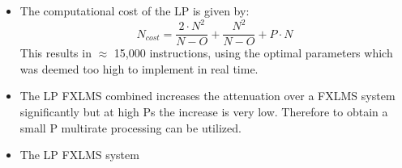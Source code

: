 \large
\begin{itemize}
\item The computational cost of the LP is given by:
	  \begin{equation}
	  N_{cost}=\frac{2\cdot N^2}{N-O}+\frac{N^2}{N-O}+P\cdot N
	  \end{equation}
	  This results in $\approx$ 15,000 instructions, using the optimal parameters which was deemed too high to implement in real time. \\
\item The LP FXLMS combined increases the attenuation over a FXLMS system significantly but at high Ps the increase is very low. 
	  Therefore to obtain a small P multirate processing can be utilized. \\ 
\item The LP FXLMS system 
\end{itemize}

